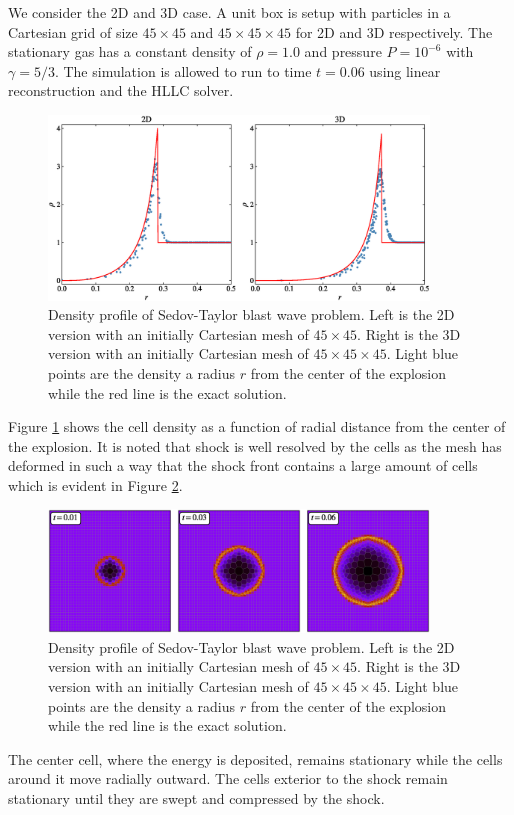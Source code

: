 We consider the 2D and 3D case. A unit box is setup with particles in a Cartesian grid of size
$45\times 45$ and $45 \times 45 \times 45$ for 2D and 3D respectively. The stationary gas has
a constant density of $\rho = 1.0$ and pressure $P = 10^{-6}$ with $\gamma=5/3$. The simulation is
allowed to run to time $t=0.06$ using linear reconstruction and the HLLC solver.
\begin{figure}
    \begin{center}
        \includegraphics[width=0.9\textwidth]{figures/sedov_compare.eps}
        \caption{Density profile of Sedov-Taylor blast wave problem. Left is the 2D version with an initially
        Cartesian mesh of $45 \times 45$. Right is the 3D version with an initially Cartesian mesh of 
        $45 \times 45 \times 45$. Light blue points are the density a radius $r$ from the center of the explosion
        while the red line is the exact solution.}
        \label{fig.sedov}
    \end{center}
\end{figure}
Figure \ref{fig.sedov} shows the cell density as a function of radial distance from the center of the
explosion. It is noted that shock is well resolved by the cells as the mesh has deformed in such a way
that the shock front contains a large amount of cells which is evident in
Figure \ref{fig.sedov_panel}.
\begin{figure}
    \begin{center}
        \includegraphics[width=0.9\textwidth]{figures/sedov_panel.eps}
        \caption{Density profile of Sedov-Taylor blast wave problem. Left is the 2D version with an initially
        Cartesian mesh of $45 \times 45$. Right is the 3D version with an initially Cartesian mesh of 
        $45 \times 45 \times 45$. Light blue points are the density a radius $r$ from the center of the explosion
        while the red line is the exact solution.}
        \label{fig.sedov_panel}
    \end{center}
\end{figure}
The center cell, where the energy is deposited, remains stationary while the
cells around it move radially outward. The cells exterior to the shock remain
stationary until they are swept and compressed by the shock.

